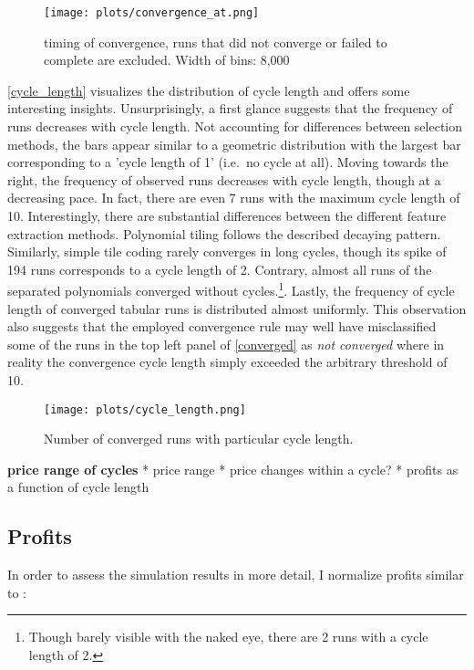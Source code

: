\begin{figure}
	\texttt{[image: plots/convergence\_at.png]}
	\caption{timing of convergence, runs that did not converge or failed to complete are excluded. Width of bins: 8,000}
	\label{convergence_at}
\end{figure}

\autoref{cycle_length} visualizes the distribution of cycle length and offers some interesting insights. Unsurprisingly, a first glance suggests that the frequency of runs decreases with cycle length. Not accounting for differences between selection methods, the bars appear similar to a geometric distribution with the largest bar corresponding to a 'cycle length of 1' (i.e.\ no cycle at all). Moving towards the right, the frequency of observed runs decreases with cycle length, though at a decreasing pace. In fact, there are even 7 runs with the maximum cycle length of 10. Interestingly, there are substantial differences between the different feature extraction methods. Polynomial tiling follows the described decaying pattern. Similarly, simple tile coding rarely converges in long cycles, though its spike of 194 runs corresponds to a cycle length of 2. Contrary, almost all runs of the separated polynomials converged without cycles.\footnote{Though barely visible with the naked eye, there are 2 runs with a cycle length of 2.}. Lastly, the frequency of cycle length of converged tabular runs is distributed almost uniformly. This observation also suggests that the employed convergence rule may well have misclassified some of the runs in the top left panel of \autoref{converged} as \emph{not converged} where in reality the convergence cycle length simply exceeded the arbitrary threshold of 10. 

\begin{figure}
	\texttt{[image: plots/cycle\_length.png]}
	\caption{Number of converged runs with particular cycle length.}
	\label{cycle_length}
\end{figure}

\textbf{price range of cycles}
* price range 
* price changes within a cycle?
* profits as a function of cycle length

\subsection{Profits}

In order to assess the simulation results in more detail, I normalize profits similar to \textcite{calvano_algorithmic_2018}:


